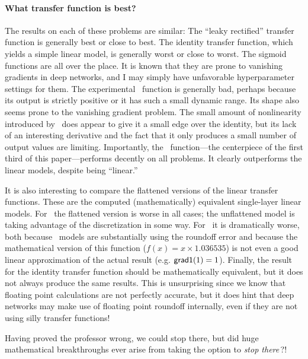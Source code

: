 \documentclass[twocolumn]{article}
\begin{document}
\paragraph{What transfer function is best?}
The results on each of these problems are similar: The ``leaky
rectified'' transfer function is generally best or close to best. The
identity transfer function, which yields a simple linear model, is
generally worst or close to worst. The sigmoid functions are all over
the place. It is known that they are prone to vanishing gradients in
deep networks, and I may simply have unfavorable hyperparameter
settings for them. The experimental \downshifttwo\ function is
generally bad, perhaps because its output is strictly positive or it
has such a small dynamic range. Its shape also seems prone to the
vanishing gradient problem. The small amount of nonlinearity
introduced by \plussixtyfour\ does appear to give it a small edge over
the identity, but its lack of an interesting derivative and the fact
that it only produces a small number of output values are
limiting. Importantly, the \gradone\ function---the centerpiece of the
first third of this paper---performs decently on all problems. It
clearly outperforms the linear models, despite being ``linear.''

It is also interesting to compare the flattened versions of the linear
transfer functions. These are the computed (mathematically) equivalent
single-layer linear models. For \plussixtyfour\ the flattened version
is worse in all cases; the unflattened model is taking advantage of
the discretization in some way. For \gradone\ it is dramatically
worse, both because \gradone\ models are substantially using the
roundoff error and because the mathematical version of this function
($f(x) = x \times 1.036535$) is not even a good linear approximation
of the actual result (e.g. ${\sf grad1}(1) = 1$). Finally, the result
for the identity transfer function should be mathematically equivalent,
but it does not always produce the same results. This is unsurprising
since we know that floating point calculations are not perfectly
accurate, but it does hint that deep networks may make use of
floating point roundoff internally, even if they are not using silly
transfer functions!

\smallskip
Having proved the professor wrong, we could stop there, but did huge
mathematical breakthroughs ever arise from taking the option to {\em stop
there}\,?!
\end{document}
